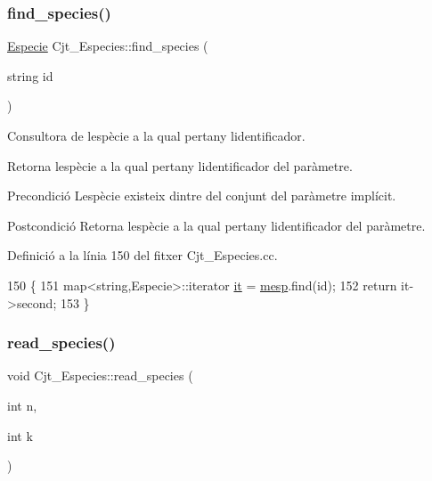 \subsubsection{\texorpdfstring{find\+\_\+species()}{find\_species()}}
{\footnotesize\ttfamily \hyperlink{class_especie}{Especie} Cjt\+\_\+\+Especies\+::find\+\_\+species (\begin{DoxyParamCaption}\item[{string}]{id }\end{DoxyParamCaption})}



Consultora de l\textquotesingle{}espècie a la qual pertany l\textquotesingle{}identificador. 

Retorna l\textquotesingle{}espècie a la qual pertany l\textquotesingle{}identificador del paràmetre.

\begin{DoxyPrecond}{Precondició}
L\textquotesingle{}espècie existeix dintre del conjunt del paràmetre implícit. 
\end{DoxyPrecond}
\begin{DoxyPostcond}{Postcondició}
Retorna l\textquotesingle{}espècie a la qual pertany l\textquotesingle{}identificador del paràmetre. 
\end{DoxyPostcond}


Definició a la línia 150 del fitxer Cjt\+\_\+\+Especies.\+cc.


\begin{DoxyCode}
150                                             \{
151     map<string,Especie>::iterator \hyperlink{class_cjt___especies_a25b19415a21bdabe9e2fc2ad7d2f68a5}{it} = \hyperlink{class_cjt___especies_a64a525b38c78935e7432b362ea9a2306}{mesp}.find(\textcolor{keywordtype}{id});
152     \textcolor{keywordflow}{return} it->second;
153 \}
\end{DoxyCode}
\mbox{\label{class_cjt___especies_a273156c50e67be8815bdd1c31cc1661a}} 
\subsubsection{\texorpdfstring{read\+\_\+species()}{read\_species()}}
{\footnotesize\ttfamily void Cjt\+\_\+\+Especies\+::read\+\_\+species (\begin{DoxyParamCaption}\item[{int}]{n,  }\item[{int}]{k }\end{DoxyParamCaption})}



